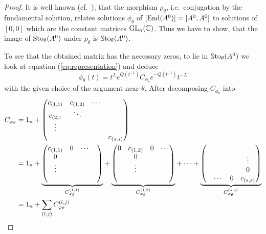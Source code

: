 \begin{proof}
  It is well known (cf.\ \cite[10]{thboalch}), that the morphism
  $\rho_{\theta}$, i.e.\ conjugation by the fundamental solution, relates
  solutions $\phi_\theta$ of $[\operatorname{End}(A^0)]=[A^0,A^0]$ to solutions of $[0,0]$
  which are the constant matrices $\operatorname{GL}_n(\mathbb{C})$.
  Thus we have to show, that the image of $\operatorname{Sto}_\theta(A^0)$ under
  $\rho_{\theta}$ is $\operatorname{\mathbb{S}to}_\theta(A^0)$.

  To see that the obtained matrix has the necessary zeros, to lie in
  $\operatorname{\mathbb{S}to}_{\theta}(A^0)$ we look at equation (\ref{eq:representation}) and
  deduce
  \begin{equation}\label{eq:repProof1}
    \phi_\theta(t)
    =t^L e^{Q(t^{-1})}C_{\phi_\theta}e^{-Q(t^{-1})}t^{-L}
  \end{equation}
  with the given choice of the argument near $\theta$.
  After decomposing $C_{\phi_\theta}$ into
  \begin{align*}
    C_{\phi_\theta}&=1_n+\begin{pmatrix}
      c_{(1,1)} & c_{(1,2)} & \cdots &\\
      c_{(2,1} & \ddots\\
      \vdots \\
      & & & c_{(s,s)}
    \end{pmatrix}
  \\&=1_n+
    \underset{C_{\phi_\theta}^{(1,1)}}{\underbrace{%
      \begin{pmatrix}
        c_{(1,1)} & 0 & \cdots &\\
        0\\
        \vdots&\\
        &
      \end{pmatrix}
    }}
    +
    \underset{C_{\phi_\theta}^{(1,2)}}{\underbrace{%
      \begin{pmatrix}
        0 & c_{(1,2)} & 0 & \cdots\\
        & 0 &\\
        &\vdots\\
        &
      \end{pmatrix}
    }}
    +\cdots+
    \underset{C_{\phi_\theta}^{(s,s)}}{\underbrace{%
      \begin{pmatrix}
        &\\
        & & & \vdots\\
        & & & 0\\
        & \cdots & 0 & c_{(s,s)}
      \end{pmatrix}
    }}
  \\&=1_n+\sum_{(l,j)}C_{\phi_\theta}^{(l,j)}

\end{align*}
\end{proof}
